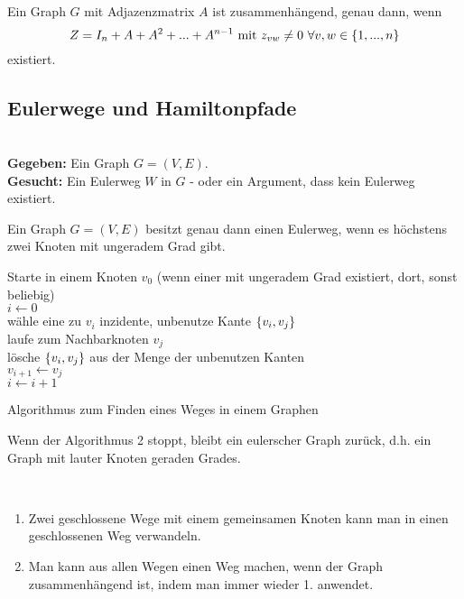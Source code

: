 	\begin{satz}
		Ein Graph $G$ mit Adjazenzmatrix $A$ ist zusammenhängend, genau dann, wenn
		\begin{equation*}
			Z = I_n + A + A^2 + ... + A^{n-1} \text{ mit } z_{vw} \neq 0~ \forall v, w \in \{1, ..., n\}
		\end{equation*}
		existiert.
	\end{satz}

	\subsection{Eulerwege und Hamiltonpfade}
	\begin{problem}[Eulerweg]~\\[5pt]
		\hspace*{10pt}\textbf{Gegeben: } Ein Graph $G = (V, E)$.\\[5pt]
		\hspace*{10pt}\textbf{Gesucht: } Ein Eulerweg $W$ in $G$ -  oder ein Argument, dass kein Eulerweg existiert.
	\end{problem}
	\begin{satz}
		Ein Graph $G = (V, E)$ besitzt genau dann einen Eulerweg, wenn es höchstens zwei Knoten mit ungeradem Grad gibt.
	\end{satz}
	\begin{algorithm}
		\vspace*{5pt}
		Starte in einem Knoten $v_0$ \newline(wenn einer mit ungeradem Grad existiert, dort, sonst beliebig)\\
		$i \leftarrow 0$\\
		{wähle eine zu $v_i$ inzidente, unbenutze Kante $\{v_i, v_j\}$\\
		laufe zum Nachbarknoten $v_j$\\
		lösche $\{v_i, v_j\}$ aus der Menge der unbenutzen Kanten\\
		$v_{i+1} \leftarrow v_j$\\
		$i \leftarrow i+1$
		}
		\caption{Algorithmus zum Finden eines Weges in einem Graphen}
	\end{algorithm}
	\begin{satz}
		Wenn der Algorithmus 2 stoppt, bleibt ein eulerscher Graph zurück, d.h. ein Graph mit lauter Knoten geraden Grades.
	\end{satz}
	\begin{korollar}~
		\begin{enumerate}
			\item Zwei geschlossene Wege mit einem gemeinsamen Knoten kann man in einen geschlossenen Weg verwandeln.
			\item Man kann aus allen Wegen einen Weg machen, wenn der Graph zusammenhängend ist, indem man immer wieder 1. anwendet.
		\end{enumerate}
	\end{korollar}
